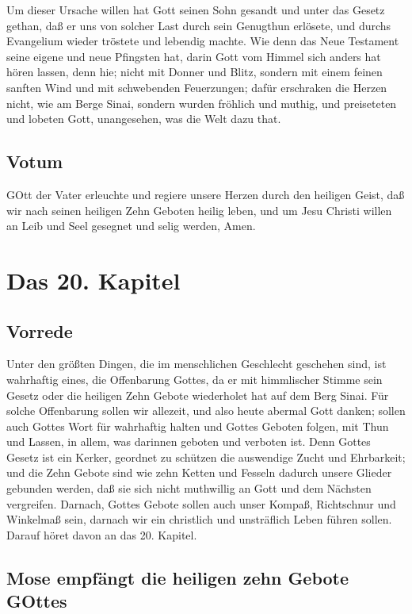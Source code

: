 Um dieser Ursache willen hat Gott seinen Sohn gesandt und unter das Gesetz gethan, daß er uns von solcher Last durch sein Genugthun erlösete, und durchs Evangelium wieder tröstete und lebendig machte. Wie denn das Neue Testament seine eigene und neue Pfingsten hat, darin Gott vom Himmel sich anders hat hören lassen, denn hie; nicht mit Donner und Blitz, sondern mit einem feinen sanften Wind und mit schwebenden Feuerzungen; dafür erschraken die Herzen nicht, wie am Berge Sinai, sondern wurden fröhlich und muthig, und preiseteten und lobeten Gott, unangesehen, was die Welt dazu that.

\section{Votum}

GOtt der Vater erleuchte und regiere unsere Herzen durch den heiligen Geist, daß wir nach seinen heiligen Zehn Geboten heilig leben, und um Jesu Christi willen an Leib und Seel gesegnet und selig werden, Amen.

\chapter{Das 20. Kapitel}

\section{Vorrede}

Unter den größten Dingen, die im menschlichen Geschlecht geschehen sind, ist wahrhaftig eines, die Offenbarung Gottes, da er mit himmlischer Stimme sein Gesetz oder die heiligen Zehn Gebote wiederholet hat auf dem Berg Sinai. Für solche Offenbarung sollen wir allezeit, und also heute abermal Gott danken; sollen auch Gottes Wort für wahrhaftig halten und Gottes Geboten folgen, mit Thun und Lassen, in allem, was darinnen geboten und verboten ist. Denn Gottes Gesetz ist ein Kerker, geordnet zu schützen die auswendige Zucht und Ehrbarkeit; und die Zehn Gebote sind wie zehn Ketten und Fesseln dadurch unsere
Glieder gebunden werden, daß sie sich nicht muthwillig an Gott und dem Nächsten vergreifen. Darnach, Gottes Gebote sollen auch unser Kompaß, Richtschnur und Winkelmaß sein, darnach wir ein christlich und unsträflich Leben führen sollen. Darauf höret davon an das 20. Kapitel.

\section{Mose empfängt die heiligen zehn Gebote GOttes}

